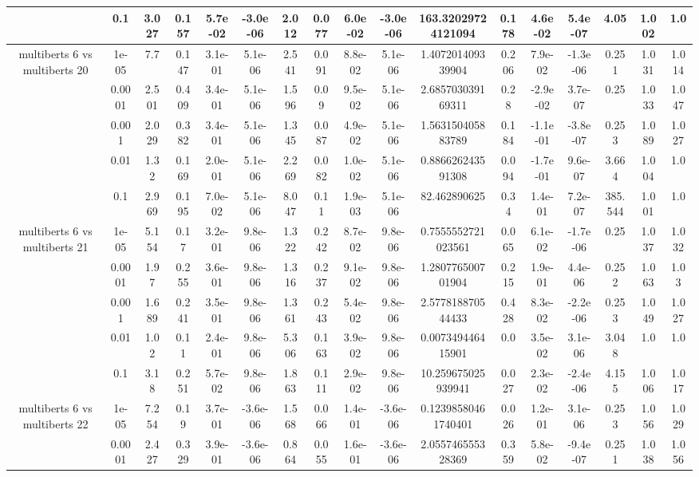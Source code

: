 \begin{tabular}{|c|c|c|c|c|c|c|c|c|c|c|c|c|c|c|c|c|}
 & 0.1 & 3.027 & 0.157 & 5.7e-02 & -3.0e-06 & 2.012 & 0.077 & 6.0e-02 & -3.0e-06 & 163.32029724121094 & 0.178 & 4.6e-02 & 5.4e-07 & 4.05 & 1.002 & 1.0 \\
\hline
\multirow{5}{*}{multiberts 6 vs multiberts 20} & 1e-05 & 7.7 & 0.147 & 3.1e-01 & 5.1e-06 & 2.541 & 0.091 & 8.8e-02 & 5.1e-06 & 1.407201409339904 & 0.206 & 7.9e-02 & -1.3e-06 & 0.251 & 1.031 & 1.014 \\
 & 0.0001 & 2.501 & 0.409 & 3.4e-01 & 5.1e-06 & 1.596 & 0.09 & 9.5e-02 & 5.1e-06 & 2.685703039169311 & 0.28 & -2.9e-02 & 3.7e-07 & 0.25 & 1.033 & 1.047 \\
 & 0.001 & 2.029 & 0.382 & 3.4e-01 & 5.1e-06 & 1.345 & 0.087 & 4.9e-02 & 5.1e-06 & 1.563150405883789 & 0.184 & -1.1e-01 & -3.8e-07 & 0.253 & 1.089 & 1.027 \\
 & 0.01 & 1.32 & 0.169 & 2.0e-01 & 5.1e-06 & 2.269 & 0.082 & 1.0e-02 & 5.1e-06 & 0.886626243591308 & 0.094 & -1.7e-01 & 9.6e-07 & 3.664 & 1.004 & 1.0 \\
 & 0.1 & 2.969 & 0.195 & 7.0e-02 & 5.1e-06 & 8.047 & 0.11 & 1.9e-03 & 5.1e-06 & 82.462890625 & 0.34 & 1.4e-01 & 7.2e-07 & 385.544 & 1.001 & 1.0 \\
\hline
\multirow{5}{*}{multiberts 6 vs multiberts 21} & 1e-05 & 5.154 & 0.17 & 3.2e-01 & 9.8e-06 & 1.322 & 0.242 & 8.7e-02 & 9.8e-06 & 0.7555552721023561 & 0.065 & 6.1e-02 & -1.7e-06 & 0.25 & 1.037 & 1.032 \\
 & 0.0001 & 1.97 & 0.255 & 3.6e-01 & 9.8e-06 & 1.316 & 0.237 & 9.1e-02 & 9.8e-06 & 1.280776500701904 & 0.215 & 1.9e-01 & 4.4e-06 & 0.252 & 1.063 & 1.03 \\
 & 0.001 & 1.689 & 0.241 & 3.5e-01 & 9.8e-06 & 1.361 & 0.243 & 5.4e-02 & 9.8e-06 & 2.577818870544433 & 0.428 & 8.3e-02 & -2.2e-06 & 0.253 & 1.049 & 1.027 \\
 & 0.01 & 1.02 & 0.11 & 2.4e-01 & 9.8e-06 & 5.306 & 0.163 & 3.9e-02 & 9.8e-06 & 0.007349446415901 & 0.0 & 3.5e-02 & 3.1e-06 & 3.048 & 1.0 & 1.0 \\
 & 0.1 & 3.18 & 0.251 & 5.7e-02 & 9.8e-06 & 1.863 & 0.111 & 2.9e-02 & 9.8e-06 & 10.259675025939941 & 0.027 & 2.3e-02 & -2.4e-06 & 4.155 & 1.006 & 1.017 \\
\hline
\multirow{5}{*}{multiberts 6 vs multiberts 22} & 1e-05 & 7.254 & 0.19 & 3.7e-01 & -3.6e-06 & 1.568 & 0.066 & 1.4e-01 & -3.6e-06 & 0.12398580461740401 & 0.026 & 1.2e-01 & 3.1e-06 & 0.253 & 1.056 & 1.029 \\
 & 0.0001 & 2.427 & 0.329 & 3.9e-01 & -3.6e-06 & 0.864 & 0.055 & 1.6e-01 & -3.6e-06 & 2.055746555328369 & 0.359 & 5.8e-02 & -9.4e-07 & 0.251 & 1.038 & 1.056 \\

\end{tabular}
